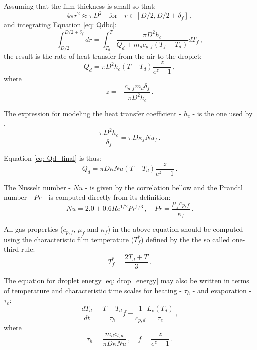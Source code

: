 Assuming that the film thickness is small so that:
\begin{equation}
4\pi r^2 \approx \pi D^2 \quad \text{for} \quad r \in [D/2, D/2+\delta_f] \, ,
\end{equation}
and integrating Equation \eqref{eq: Qdbc}:
\begin{equation}
\int_{D/2}^{D/2+\delta_f} dr = \int_{T_d}^{T} \frac{\pi D^2 h_c}{Q_d +\dot{m}_d c_{p,f} \left(T_f-T_d\right)}dT_f \, ,
\end{equation}
the result is the rate of heat transfer from the air to the droplet:
\begin{equation}\label{eq: Qd_final}
Q_d = \pi D^2 h_c \left( T - T_d \right)\frac{z}{e^z-1} \, ,
\end{equation}
where
\begin{equation*}
z= - \frac{c_{p,f} \dot{m}_d \delta_f}{ \pi D^2 h_c} \, .
\end{equation*}

The expression for modeling the heat transfer coefficient - $h_c$ - is the one used by \cite{nordin},
\begin{equation}
  \frac{\pi D^2 h_c}{\delta_f} = \pi D \kappa_f Nu_f \, .
\end{equation}

Equation \eqref{eq: Qd_final} is thus: 
\begin{equation}
Q_d = \pi D \kappa Nu \left( T-T_d \right)  \frac{z}{e^z-1} \, .
\end{equation}

The Nusselt number - $Nu$ - is given by the correlation bellow and the Prandtl number - $Pr$ - is computed directly from its definition:
\begin{equation}
 Nu= 2.0 +0.6 Re^{1/2} Pr^{1/3} \, , \quad Pr = \frac{\mu_f c_{p,f}}{\kappa_f} \, .
\end{equation}

All gas properties ($c_{p,f}$, $\mu_f$ and $\kappa_f$) in the above equation should be computed using the characteristic film temperature ($T^{*}_f$) defined by the the so called one-third rule:
\begin{equation}
 T^{*}_f = \frac{2T_d + T}{3} \, .
\end{equation}

The equation for droplet energy \eqref{eq: drop_energy} may also be written in terms of temperature and characteristic time scales for heating - $\tau_h$ - and evaporation - $\tau_e$:
\begin{equation}
 \frac{dT_d}{dt}= \frac{T-T_d}{\tau_h} f - \frac{1}{c_{p,d}} \frac{L_v\left( T_d\right) }{\tau_e} \, ,
\end{equation}
where
\begin{equation}
 \tau_h=\frac{m_d c_{l,d}}{\pi D \kappa Nu} \, , \quad f =  \frac{z}{e^z-1} \, .
\end{equation}

